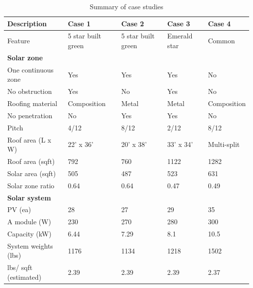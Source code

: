 \documentclass[]{article}
\begin{document}
\begin{table}[t]

\caption{\label{tab:unnamed-chunk-5}Summary of case studies}
\centering
\begin{tabular}{l|l|l|l|l}
\hline
Description & Case 1 & Case 2 & Case 3 & Case 4\\
\hline
Feature & 5 star built green & 5 star built green & Emerald star & Common\\
\hline
\multicolumn{5}{l}{\textbf{Solar zone}}\\
\hline
\hspace{1em}One continuous zone & Yes & Yes & Yes & No\\
\hline
\hspace{1em}No obstruction & Yes & No & Yes & No\\
\hline
\hspace{1em}Roofing material & Composition & Metal & Metal & Composition\\
\hline
\hspace{1em}No penetration & No & Yes & Yes & No\\
\hline
\hspace{1em}Pitch & 4/12 & 8/12 & 2/12 & 8/12\\
\hline
\hspace{1em}Roof area (L x W) & 22' x 36' & 20' x 38' & 33' x 34' & Multi-split\\
\hline
\hspace{1em}Roof area (sqft) & 792 & 760 & 1122 & 1282\\
\hline
\hspace{1em}Solar area (sqft) & 505 & 487 & 523 & 631\\
\hline
\hspace{1em}Solar zone ratio & 0.64 & 0.64 & 0.47 & 0.49\\
\hline
\multicolumn{5}{l}{\textbf{Solar system}}\\
\hline
\hspace{1em}PV (ea) & 28 & 27 & 29 & 35\\
\hline
\hspace{1em}A module (W) & 230 & 270 & 280 & 300\\
\hline
\hspace{1em}Capacity (kW) & 6.44 & 7.29 & 8.1 & 10.5\\
\hline
\hspace{1em}System weights (lbs) & 1176 & 1134 & 1218 & 1502\\
\hline
\hspace{1em}lbs/ sqft (estimated) & 2.39 & 2.39 & 2.39 & 2.37\\

\end{tabular}
\end{table}
\end{document}
